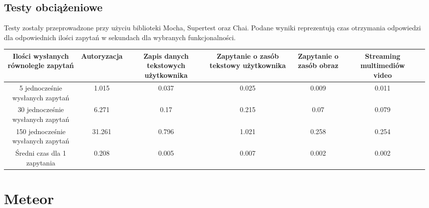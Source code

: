 \documentclass[12pt]{report}
\begin{document}
    \subsection{Testy obciążeniowe}
      Testy zostały przeprowadzone przy użyciu biblioteki Mocha, Supertest oraz Chai.
      Podane wyniki reprezentują czas otrzymania odpowiedzi dla odpowiednich ilości zapytań w sekundach dla wybranych funkcjonalności.
      \newline
      \newline
      \newline
      \newline
      \newline
      \newline
      \newline
      \newline
      \newline
      \newline
      \newline
      \begingroup
        \renewcommand{\arraystretch}{3.5}
        \begin{adjustbox}{center}
          \begin{tabular}{|c|c|c|c|c|c|p{2.6cm}}
            \hline
            \parbox{2.6cm}{Ilości wysłanych równolegle zapytań} & 
            \parbox{2.6cm}{Autoryzacja} & 
            \parbox{2.6cm}{Zapis danych tekstowych użytkownika} & 
            \parbox{2.6cm}{Zapytanie o zasób tekstowy użytkownika} & 
            \parbox{2.6cm}{Zapytanie o zasób obraz} & 
            \parbox{2.6cm}{Streaming multimediów video} \\
            \hline
            \parbox{2.6cm}{5 jednocześnie wysłanych zapytań} & 1.015 & 0.037 & 0.025 & 0.009 & 0.011 \\
            \hline
            \parbox{2.6cm}{30 jednocześnie wysłanych zapytań} & 6.271 & 0.17 & 0.215 & 0.07 & 0.079 \\
            \hline
            \parbox{2.6cm}{150 jednocześnie wysłanych zapytań} & 31.261 & 0.796 & 1.021 & 0.258 & 0.254 \\
            \hline
            \parbox{2.6cm}{Średni czas dla 1 zapytania} & 0.208 & 0.005 & 0.007 & 0.002 & 0.002 \\
            \hline
          \end{tabular}
        \end{adjustbox}
      \endgroup

  \pagebreak
  \section{Meteor}
\end{document}
